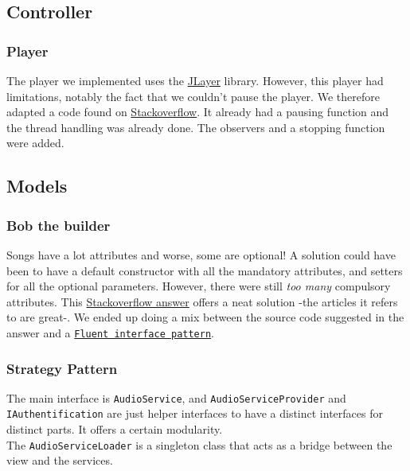 \documentclass{report}
\begin{document}
\subsection{Controller}

\subsubsection{Player}

The player we implemented uses the \href{http://www.javazoom.net/javalayer/javalayer.html}{JLayer} library. However, this player had limitations, notably the fact that we couldn't pause the player. We therefore adapted a code found on \href{http://stackoverflow.com/questions/12057214/jlayer-pause-and-resume-song}{Stackoverflow}. It already had a pausing function and the thread handling was already done. The observers and a stopping function were added.

\subsection{Models}

\subsubsection{Bob the builder}
Songs have a lot attributes and worse, some are optional! A solution could have been to have a default constructor with all the mandatory attributes, and setters for all the optional parameters. However, there were still \textit{too many} compulsory attributes. This \href{http://stackoverflow.com/a/40324/5795409}{Stackoverflow answer} offers a neat solution -the articles it refers to are great-. We ended up doing a mix between the source code suggested in the answer and a \href{https://dzone.com/articles/factories-builders-and-fluent-}{\texttt{Fluent interface pattern}}.

\subsubsection{Strategy Pattern}
The main interface is \texttt{AudioService},  and \texttt{AudioServiceProvider} and \texttt{IAuthentification} are just helper interfaces to have a distinct interfaces for distinct parts. It offers a certain modularity. \\
The \texttt{AudioServiceLoader} is a singleton class that acts as a bridge between the view and the services. 

\end{document}
